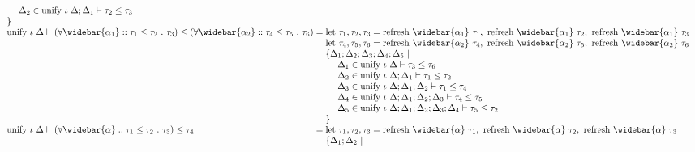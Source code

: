 \documentclass[sigplan,screen]{acmart}
\begin{document}
\begin{figure*}[h]
\[\begin{array}{l @{} l}
\begin{array}[t]{@{} l}
        \\
        \ \ \ \ \Delta_2 \in \text{unify } \iota\ \Delta;\Delta_1 \vdash \tau_2 \leq \tau_3
        \\
        \}
      \end{array}
      \\
      \text{unify } \iota\ \Delta \vdash
      (\forall \widebar{\alpha_1} :: \tau_1 \leq \tau_2\ .\ \tau_3)
      \leq 
      (\forall \widebar{\alpha_2} :: \tau_4 \leq \tau_5\ .\ \tau_6)
      &{} = 
      \begin{array}[t]{@{} l}
        \text{let } \tau_1, \tau_2, \tau_3 = 
        \text{refresh } \widebar{\alpha_1}\ \tau_1,\ 
        \text{refresh } \widebar{\alpha_1}\ \tau_2,\ 
        \text{refresh } \widebar{\alpha_1}\ \tau_3
        \\
        \text{let } \tau_4, \tau_5, \tau_6 = 
        \text{refresh } \widebar{\alpha_2}\ \tau_4,\ 
        \text{refresh } \widebar{\alpha_2}\ \tau_5,\ 
        \text{refresh } \widebar{\alpha_2}\ \tau_6
        \\
        \{\Delta_1;\Delta_2;\Delta_3;\Delta_4;\Delta_5\ |
        \\ 
        \ \ \ \ \Delta_1 \in \text{unify } \iota\ \Delta \vdash \tau_3 \leq \tau_6
        \\
        \ \ \ \ \Delta_2 \in \text{unify } \iota\ \Delta;\Delta_1 \vdash \tau_1 \leq \tau_2
        \\ 
        \ \ \ \ \Delta_3 \in \text{unify } \iota\ \Delta;\Delta_1;\Delta_2 \vdash \tau_1 \leq \tau_4
        \\ 
        \ \ \ \ \Delta_4 \in \text{unify } \iota\ \Delta;\Delta_1;\Delta_2;\Delta_3 \vdash \tau_4 \leq \tau_5
        \\ 
        \ \ \ \ \Delta_5 \in \text{unify } \iota\ \Delta;\Delta_1;\Delta_2;\Delta_3;\Delta_4 \vdash \tau_5 \leq \tau_2
        \\
        \}
      \end{array}
      \\
      \text{unify } \iota\ \Delta \vdash
      (\forall \widebar{\alpha} :: \tau_1 \leq \tau_2\ .\ \tau_3)
      \leq 
      \tau_4
      &{} = 
      \begin{array}[t]{@{} l}
        \text{let } \tau_1, \tau_2, \tau_3 = 
        \text{refresh } \widebar{\alpha}\ \tau_1,\ 
        \text{refresh } \widebar{\alpha}\ \tau_2,\ 
        \text{refresh } \widebar{\alpha}\ \tau_3
        \\
        \{\Delta_1;\Delta_2\ |
        \\ 

\end{array}
\end{array}\]
\end{figure*}
\end{document}

